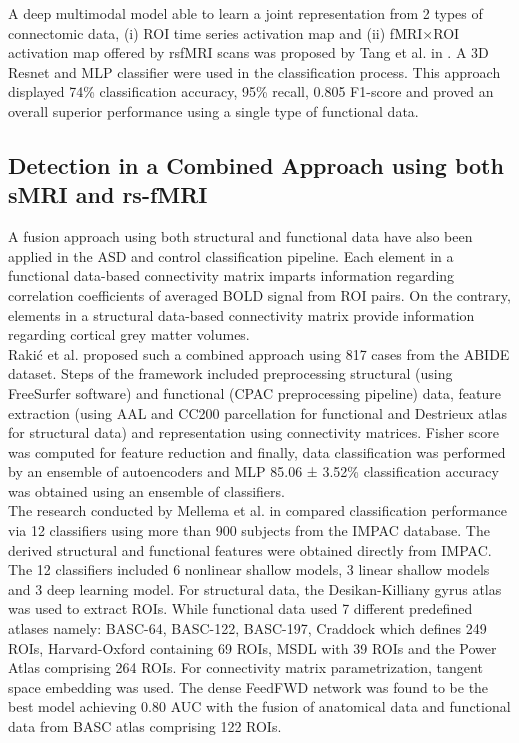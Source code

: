 A deep multimodal model able to learn a joint representation from 2 types of connectomic
data, (i) ROI time series activation map and (ii) fMRI×ROI activation map offered by rsfMRI
scans was proposed by Tang et al. in \cite{tang2020deep}. A 3D Resnet and MLP classifier were used
in the classification process. This approach displayed 74\% classification accuracy, 95\%
recall, 0.805 F1-score and proved an overall superior performance using a single type of
functional data.\\

\subsection{Detection in a Combined Approach using both sMRI and rs-fMRI}
A fusion approach using both structural and functional data have also been applied in the
ASD and control classification pipeline. Each element in a functional data-based connectivity
matrix imparts information regarding correlation coefficients of averaged BOLD signal from
ROI pairs. On the contrary, elements in a structural data-based connectivity matrix provide
information regarding cortical grey matter volumes.\\

Rakić et al. \cite{rakic2020improving} proposed such a combined approach using 817 cases from the \Gls{ABIDE}
dataset. Steps of the framework included preprocessing structural (using FreeSurfer software)
and functional (\Gls{CPAC} preprocessing pipeline) data, feature extraction (using \Gls{AAL} and
\Gls{CC200} parcellation for functional and Destrieux atlas for structural data) and representation
using connectivity matrices. Fisher score was computed for feature reduction and finally, data
classification was performed by an ensemble of autoencoders and \Gls{MLP} 85.06 ± 3.52\%
classification accuracy was obtained using an ensemble of classifiers.\\

The research conducted by Mellema et al. in \cite{mellema2019multiple} compared classification performance via 12
classifiers using more than 900 subjects from the \Gls{IMPAC} database. The derived structural and functional features were obtained directly from IMPAC. The 12 classifiers included 6
nonlinear shallow models, 3 linear shallow models and 3 deep learning model. For structural
data, the Desikan-Killiany gyrus atlas was used to extract ROIs. While functional data used 7
different predefined atlases namely: \Gls{BASC}-64, BASC-122, BASC-197, Craddock which
defines 249 ROIs, Harvard-Oxford containing 69 ROIs, \Gls{MSDL} with 39 ROIs and the Power
Atlas comprising 264 ROIs. For connectivity matrix parametrization, tangent space
embedding was used. The dense FeedFWD network was found to be the best model
achieving 0.80 \Gls{AUC} with the fusion of anatomical data and functional data from \Gls{BASC} atlas
comprising 122 ROIs.\\

